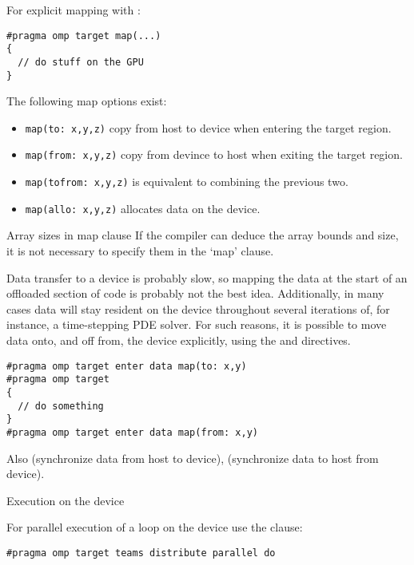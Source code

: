 For explicit mapping with :
\begin{lstlisting}
#pragma omp target map(...)
{
  // do stuff on the GPU
}
\end{lstlisting}
The following map options exist:
\begin{itemize}
\item \lstinline+map(to: x,y,z)+ copy from host to device
  when entering the target region.
\item \lstinline+map(from: x,y,z)+ copy from devince to host
  when exiting the target region.
\item \lstinline+map(tofrom: x,y,z)+ is equivalent to combining the previous two.
\item \lstinline+map(allo: x,y,z)+ allocates data on the device.
\end{itemize}

\begin{fortrannote}{Array sizes in map clause}
  If the compiler can deduce the array bounds and size,
  it is not necessary to specify them in the `map' clause.
\end{fortrannote}

Data transfer to a device is probably slow,
so mapping the data at the start of an offloaded section of code
is probably not the best idea.
Additionally, in many cases data will stay resident on the device
throughout several iterations of, for instance, a time-stepping \ac{PDE} solver.
For such reasons, it is possible to move data onto, and off from,
the device explicitly,
using the  and
 directives.

\begin{lstlisting}
#pragma omp target enter data map(to: x,y)
#pragma omp target
{
  // do something
}
#pragma omp target enter data map(from: x,y)
\end{lstlisting}

Also 
(synchronize data from host to device),
(synchronize data to host from device).

 {Execution on the device}
\label{sec:omp-team}

For parallel execution of a loop on the device
use the  clause:
\begin{lstlisting}
#pragma omp target teams distribute parallel do
\end{lstlisting}

